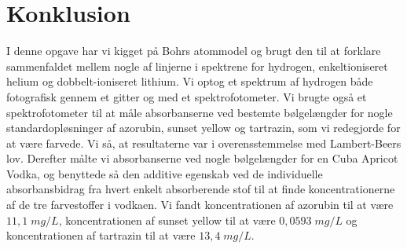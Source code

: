 \documentclass[11pt]{article}
\theoremstyle{definition}
\begin{document}
\section{Konklusion}
I denne opgave har vi kigget på Bohrs atommodel og brugt den til at forklare sammenfaldet mellem nogle af linjerne i spektrene for hydrogen, enkeltioniseret helium og dobbelt-ioniseret lithium.
Vi optog et spektrum af hydrogen både fotografisk gennem et gitter og med et spektrofotometer.
Vi brugte også et spektrofotometer til at måle absorbanserne ved bestemte bølgelængder for nogle standardopløsninger af azorubin, sunset yellow og tartrazin, som vi redegjorde for at være farvede.
Vi så, at resultaterne var i overensstemmelse med Lambert-Beers lov.
Derefter målte vi absorbanserne ved nogle bølgelængder for en Cuba Apricot Vodka, og benyttede så den additive egenskab ved de individuelle absorbansbidrag fra hvert enkelt absorberende stof til at finde koncentrationerne af de tre farvestoffer i vodkaen.
Vi fandt koncentrationen af azorubin til at være $11,1 \;\unit{mg/L} $, koncentrationen af sunset yellow til at være $0,0593 \;\unit{mg/L} $ og koncentrationen af tartrazin til at være $13,4 \;\unit{mg/L} $. 

\newpage
\singlespacing %
\setlength{\bibsep}{5pt} %
\thispagestyle{empty} %
\end{document}
